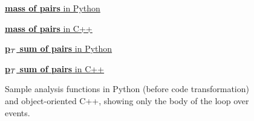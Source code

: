 \documentclass[10pt, conference, compsocconf]{IEEEtran}
\begin{document}
\begin{figure}
\begin{minipage}{\textwidth}
\vspace{0.25 cm}
\begin{minipage}[c][3.2cm][t]{0.22\linewidth}
\underline{{\bf mass of pairs} in Python}

\end{minipage}
\begin{minipage}[c][3.2cm][t]{0.25\linewidth}
\underline{{\bf mass of pairs} in C++}

\end{minipage}%

\vspace{0.25 cm}
\begin{minipage}[c][2.4cm][t]{0.22\linewidth}
\underline{{\bf p$_{\mbox{\tiny T}}$ sum of pairs} in Python}

\end{minipage}
\begin{minipage}[c][2.4cm][t]{0.25\linewidth}
\underline{{\bf p$_{\mbox{\tiny T}}$ sum of pairs} in C++}

\end{minipage}%
\end{minipage}

\caption{\label{four-functions} Sample analysis functions in Python (before code transformation) and object-oriented C++, showing only the body of the loop over events.}
\end{figure}
\end{document}
